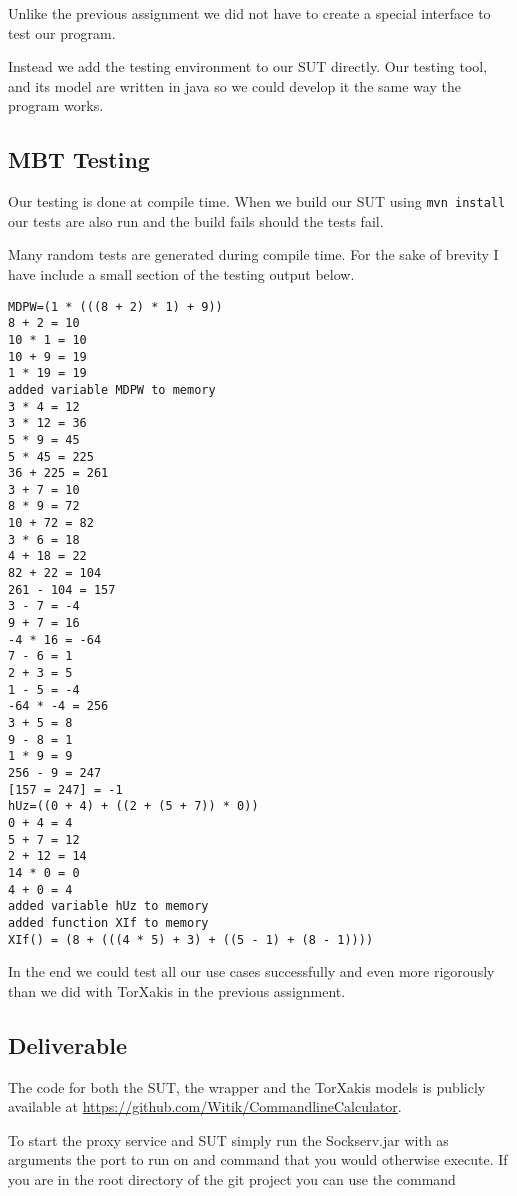 \documentclass[11pt,a4paper]{article}
\begin{document}
Unlike the previous assignment we did not have to create a special
interface to test our program.

Instead we add the testing environment to our SUT directly. Our
testing tool, and its model are written in java so we could develop it
the same way the program works.

\subsection{MBT Testing}

Our testing is done at compile time. When we build our SUT using
\verb|mvn install| our tests are also run and the build fails should
the tests fail.

Many random tests are generated during compile time. For the sake of
brevity I have include a small section of the testing output below.

\begin{verbatim}
MDPW=(1 * (((8 + 2) * 1) + 9))
8 + 2 = 10
10 * 1 = 10
10 + 9 = 19
1 * 19 = 19
added variable MDPW to memory
3 * 4 = 12
3 * 12 = 36
5 * 9 = 45
5 * 45 = 225
36 + 225 = 261
3 + 7 = 10
8 * 9 = 72
10 + 72 = 82
3 * 6 = 18
4 + 18 = 22
82 + 22 = 104
261 - 104 = 157
3 - 7 = -4
9 + 7 = 16
-4 * 16 = -64
7 - 6 = 1
2 + 3 = 5
1 - 5 = -4
-64 * -4 = 256
3 + 5 = 8
9 - 8 = 1
1 * 9 = 9
256 - 9 = 247
[157 = 247] = -1
hUz=((0 + 4) + ((2 + (5 + 7)) * 0))
0 + 4 = 4
5 + 7 = 12
2 + 12 = 14
14 * 0 = 0
4 + 0 = 4
added variable hUz to memory
added function XIf to memory
XIf() = (8 + (((4 * 5) + 3) + ((5 - 1) + (8 - 1))))
\end{verbatim}

In the end we could test all our use cases successfully and even more
rigorously than we did with TorXakis in the previous assignment.


\subsection{Deliverable}

The code for both the SUT, the wrapper and the TorXakis models is
publicly available at
\url{https://github.com/Witik/CommandlineCalculator}.

To start the proxy service and SUT simply run the Sockserv.jar with as
arguments the port to run on and command that you would otherwise
execute. If you are in the root directory of the git project you can
use the command
\end{document}

